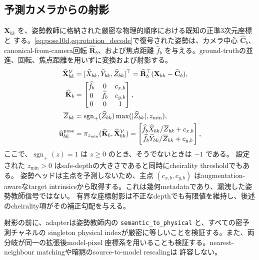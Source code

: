 \subsection{予測カメラからの射影}

\(\mathbf{X}_{bk}\) を、姿勢教師に格納された厳密な物理的順序における既知の正準3次元座標と
する。\cref{eq:pose10d,eq:rotation_decode}で復号された姿勢は、カメラ中心
\(\widehat{\mathbf{C}}_b\)、canonical-from-camera回転 \(\widehat{\mathbf{R}}_b\)、および焦点距離
\(\widehat f_b\) を与える。ground-truthの並進、回転、焦点距離を用いずに変換および射影する。
\begin{align}
  \widehat{\mathbf{X}}^{\mathcal{V}}_{bk}
    &=[\widehat X_{bk},\widehat Y_{bk},\widehat Z_{bk}]^{\top}
      =\widehat{\mathbf{R}}_b^{\top}
      (\mathbf{X}_{bk}-\widehat{\mathbf{C}}_b), \\
  \widehat{\mathbf{K}}_b
    &=\begin{bmatrix}
       \widehat f_b&0&c_{x,b}\\
       0&\widehat f_b&c_{y,b}\\
       0&0&1
      \end{bmatrix}, \\
  \overline Z_{bk}
    &=\operatorname{sgn}_{+}(\widehat Z_{bk})
      \max(|\widehat Z_{bk}|,z_{\min}), \\
  \widehat{\mathbf{u}}^{\mathrm{pose}}_{bk}
    &=\pi_{z_{\min}}(\widehat{\mathbf{K}}_b,
       \widehat{\mathbf{X}}^{\mathcal{V}}_{bk})
      =\begin{bmatrix}
        \widehat f_b\widehat X_{bk}/\overline Z_{bk}+c_{x,b}\\
        \widehat f_b\widehat Y_{bk}/\overline Z_{bk}+c_{y,b}
       \end{bmatrix},
  \label{eq:predicted_projection}
\end{align}
ここで、\(\operatorname{sgn}_{+}(z)=1\) は \(z\geq0\) のとき、そうでないときは \(-1\) である。
設定された \(z_{\min}>0\) はsafe-depthの大きさであると同時にcheirality thresholdでもある。
姿勢ヘッドは主点を予測しないため、主点 \((c_{x,b},c_{y,b})\) はaugmentation-awareなtarget
intrinsicsから取得する。これは幾何metadataであり、漏洩した姿勢教師信号ではない。
有界な座標射影は不正なdepthでも有限値を維持し、後述のcheirality項がその補正勾配を与える。

射影の前に、adapterは姿勢教師内の \texttt{semantic\_to\_physical} と、すべての密予測チャネルの
singleton physical indexが厳密に等しいことを検証する。また、両分岐が同一の拡張後model-pixel
座標系を用いることも検証する。nearest-neighbour matchingや暗黙のsource-to-model rescalingは
許容しない。

